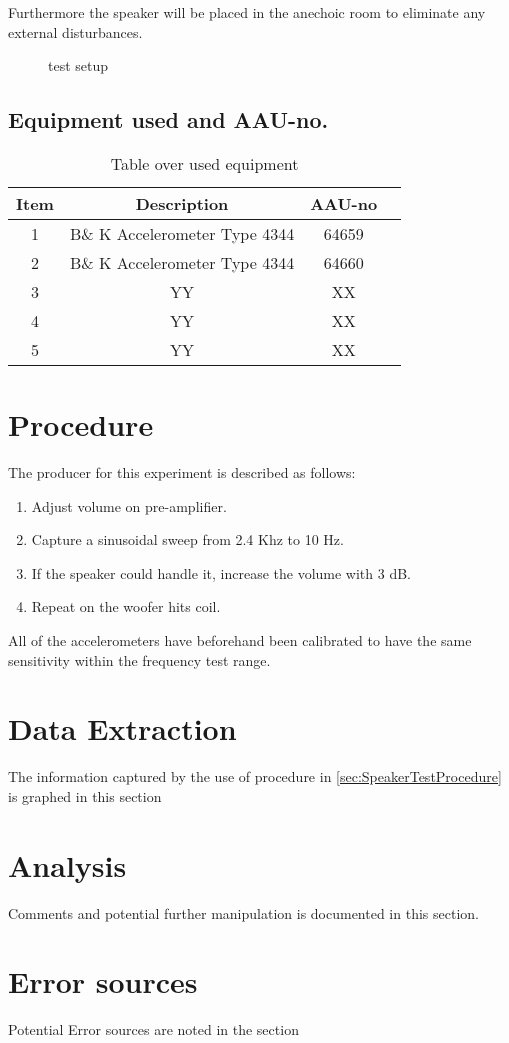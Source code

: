 Furthermore the speaker will be placed in the anechoic room to eliminate any external disturbances. 


\begin{figure}[H]
\centering
{}
\caption{test setup}
\label{figure:SpeakertestSetup}
\end{figure}

\subsection*{Equipment used and AAU-no.}

\begin{table}[H]
\centering
{}
\begin{tabular}{S[table-format=1]ccc} \toprule
    {Item} & {Description} & {AAU-no} \\       &  B\& K Accelerometer Type 4344  & 64659   \\ 
    2      &  B\& K Accelerometer Type 4344  & 64660   \\ 
    3      & YY  & XX   \\
    4      & YY  & XX   \\ 
    5      & YY  & XX  \\ \bottomrule 
\end{tabular}
\caption{Table over used equipment}
\end{table}



\section{Procedure}\label{sec:SpeakerTestProcedure}

The producer for this experiment is described as follows:
\begin{enumerate}
\item Adjust volume on pre-amplifier.
\item Capture a sinusoidal sweep from 2.4 Khz to 10 Hz.
\item If the speaker could handle it, increase the volume with 3 dB.
\item Repeat on the woofer hits coil. 
\end{enumerate}

All of the accelerometers have beforehand been calibrated to have the same sensitivity within the frequency test range.


\section{Data Extraction}

The information captured by the use of procedure in \autoref{sec:SpeakerTestProcedure} is graphed in this section


\section{Analysis}

Comments and potential further manipulation is documented in this section. 

\section{Error sources}

Potential Error sources are noted in the section

